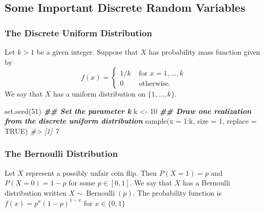 \documentclass[
  14pt,
]{memoir}
\newenvironment{Shaded}{\begin{snugshade}}{\end{snugshade}}
\newcommand{\AttributeTok}[1]{\textcolor[rgb]{0.77,0.63,0.00}{#1}}
\newcommand{\CommentTok}[1]{\textcolor[rgb]{0.56,0.35,0.01}{\textit{#1}}}
\newcommand{\ConstantTok}[1]{\textcolor[rgb]{0.00,0.00,0.00}{#1}}
\newcommand{\DecValTok}[1]{\textcolor[rgb]{0.00,0.00,0.81}{#1}}
\newcommand{\DocumentationTok}[1]{\textcolor[rgb]{0.56,0.35,0.01}{\textbf{\textit{#1}}}}
\newcommand{\FunctionTok}[1]{\textcolor[rgb]{0.00,0.00,0.00}{#1}}
\newcommand{\NormalTok}[1]{#1}
\newcommand{\OtherTok}[1]{\textcolor[rgb]{0.56,0.35,0.01}{#1}}
\newcommand{\SpecialCharTok}[1]{\textcolor[rgb]{0.00,0.00,0.00}{#1}}
\begin{document}
\hypertarget{some-important-discrete-random-variables}{%
\subsection{Some Important Discrete Random Variables}\label{some-important-discrete-random-variables}}

\hypertarget{the-discrete-uniform-distribution}{%
\subsubsection{The Discrete Uniform Distribution}\label{the-discrete-uniform-distribution}}

Let \(k>1\) be a given integer. Suppose that \(X\) has probability mass function given by
\[
f(x)=\left\{\begin{array}{ll}
1 / k & \text { for } x=1, \ldots, k \\
0 & \text { otherwise. }
\end{array}\right.
\]
We say that \(X\) has a uniform distribution on \(\{1, \ldots, k\}\).

\begin{Shaded}
\begin{Highlighting}[]
\FunctionTok{set.seed}\NormalTok{(}\DecValTok{51}\NormalTok{)}
\DocumentationTok{\#\# Set the parameter k}
\NormalTok{k }\OtherTok{\textless{}{-}} \DecValTok{10}
\DocumentationTok{\#\# Draw one realization from the discrete uniform distribution}
\FunctionTok{sample}\NormalTok{(}\AttributeTok{x =} \DecValTok{1}\SpecialCharTok{:}\NormalTok{k, }\AttributeTok{size =} \DecValTok{1}\NormalTok{, }\AttributeTok{replace =} \ConstantTok{TRUE}\NormalTok{)}
\CommentTok{\#\textgreater{} [1] 7}
\end{Highlighting}
\end{Shaded}

\hypertarget{the-bernoulli-distribution}{%
\subsubsection{The Bernoulli Distribution}\label{the-bernoulli-distribution}}

Let \(X\) represent a possibly unfair coin flip. Then \(P(X=1)=p\) and \(P(X=0)=1-p\) for some \(p \in[0,1]\). We say that \(X\) has a Bernoulli distribution written \(X\sim\operatorname{Bernoulli }(p)\). The probability function is \(f(x)=p^{x}(1-p)^{1-x}\) for \(x \in\{0,1\}\)
\end{document}

